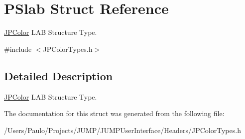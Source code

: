 \hypertarget{struct_p_slab}{
\section{PSlab Struct Reference}
\label{struct_p_slab}
}


\hyperlink{interface_j_p_color}{JPColor} LAB Structure Type.  




{\ttfamily \#include $<$JPColorTypes.h$>$}



\subsection{Detailed Description}
\hyperlink{interface_j_p_color}{JPColor} LAB Structure Type. 

The documentation for this struct was generated from the following file:\begin{DoxyCompactItemize}
\item 
/Users/Paulo/Projects/JUMP/JUMPUserInterface/Headers/JPColorTypes.h\end{DoxyCompactItemize}
